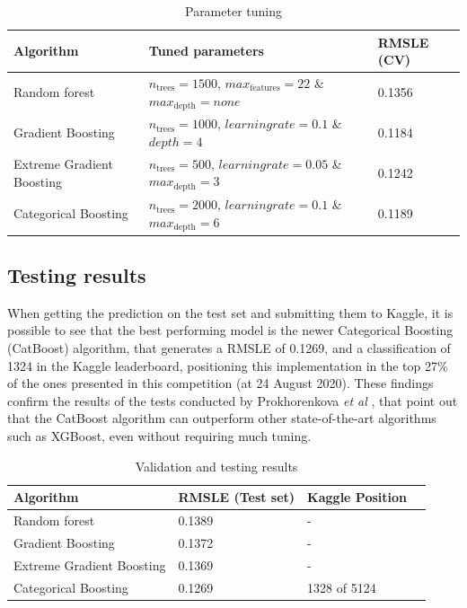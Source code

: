 \documentclass[11pt,onecolumn,titlepage,letterpaper]{article}
\begin{document}
\begin{table}[H]
	\begin{center}
		\begin{tabular}{|p{4.2cm}|p{9cm}|p{2.5cm}|}
			\hline
			Algorithm & Tuned parameters & RMSLE (CV) \\
			\hline\hline
			Random forest & $n_\mathrm{trees} = 1500$, $max_\mathrm{features} = 22$ \&  $max_\mathrm{depth} = none$ & 0.1356\\
			Gradient Boosting & $n_\mathrm{trees} = 1000$, $learning rate = 0.1$ \& $depth = 4$ & 0.1184\\
			Extreme Gradient Boosting  & $n_\mathrm{trees} = 500$, $learning rate = 0.05$ \& $max_\mathrm{depth} = 3$ & 0.1242 \\
			Categorical Boosting & $n_\mathrm{trees} = 2000$, $learning rate = 0.1$ \& $max_\mathrm{depth} = 6$ & 0.1189\\
			\hline
		\end{tabular}
	\end{center}
	\caption{Parameter tuning}
	\label{table:tuningres}
\end{table}

\subsection{Testing results}

When getting the prediction on the test set and submitting them to Kaggle, it is possible to see that the best performing model is the newer Categorical Boosting (CatBoost) algorithm, that generates a RMSLE of 0.1269, and a classification of 1324 in the Kaggle leaderboard, positioning this implementation in the top 27\% of the ones presented in this competition (at 24 August 2020). These findings confirm the results of the tests conducted by Prokhorenkova \textit{et al} \cite{Prokhorenkova2018a}, that point out that the CatBoost algorithm can outperform other state-of-the-art algorithms such as XGBoost, even without requiring much tuning.

\begin{table}[H]
	\begin{center}
		\begin{tabular}{|p{4.2cm}|p{3cm}|p{3cm}|p{3cm}|}
			\hline
			Algorithm & RMSLE (Test set) & Kaggle Position \\
			\hline\hline
			Random forest & 0.1389 & -\\
			Gradient Boosting & 0.1372 & - \\
			Extreme Gradient Boosting  & 0.1369
			 & -\\
			Categorical Boosting & 0.1269 & 1328 of 5124\\
			\hline
		\end{tabular}
	\end{center}
	\caption{Validation and testing results}
	\label{table:test}
\end{table}
\end{document}
